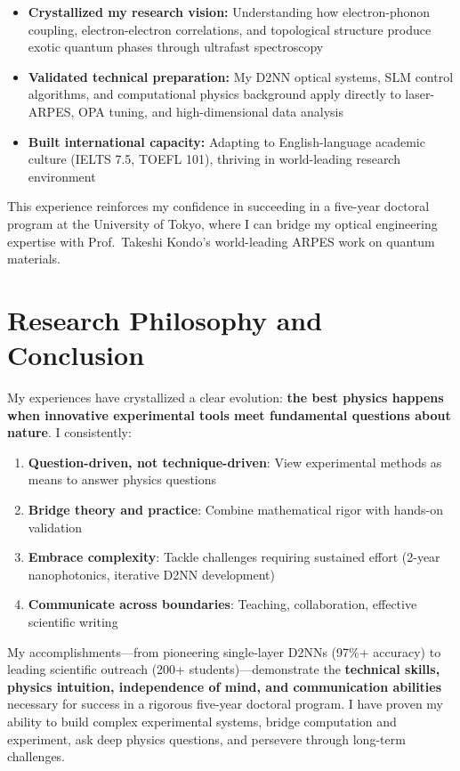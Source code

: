\documentclass[11pt,a4paper]{article}
\begin{document}
\begin{itemize}
    \item \textbf{Crystallized my research vision:} Understanding how electron-phonon coupling, electron-electron correlations, and topological structure produce exotic quantum phases through ultrafast spectroscopy
    \item \textbf{Validated technical preparation:} My D2NN optical systems, SLM control algorithms, and computational physics background apply directly to laser-ARPES, OPA tuning, and high-dimensional data analysis
    \item \textbf{Built international capacity:} Adapting to English-language academic culture (IELTS 7.5, TOEFL 101), thriving in world-leading research environment
\end{itemize}

This experience reinforces my confidence in succeeding in a five-year doctoral program at the University of Tokyo, where I can bridge my optical engineering expertise with Prof.~Takeshi Kondo's world-leading ARPES work on quantum materials.

\section{Research Philosophy and Conclusion}

My experiences have crystallized a clear evolution: \textbf{the best physics happens when innovative experimental tools meet fundamental questions about nature}. I consistently:

\begin{enumerate}
    \item \textbf{Question-driven, not technique-driven}: View experimental methods as means to answer physics questions
    \item \textbf{Bridge theory and practice}: Combine mathematical rigor with hands-on validation
    \item \textbf{Embrace complexity}: Tackle challenges requiring sustained effort (2-year nanophotonics, iterative D2NN development)
    \item \textbf{Communicate across boundaries}: Teaching, collaboration, effective scientific writing
\end{enumerate}

My accomplishments—from pioneering single-layer D2NNs (97\%+ accuracy) to leading scientific outreach (200+ students)—demonstrate the \textbf{technical skills, physics intuition, independence of mind, and communication abilities} necessary for success in a rigorous five-year doctoral program. I have proven my ability to build complex experimental systems, bridge computation and experiment, ask deep physics questions, and persevere through long-term challenges.
\end{document}
